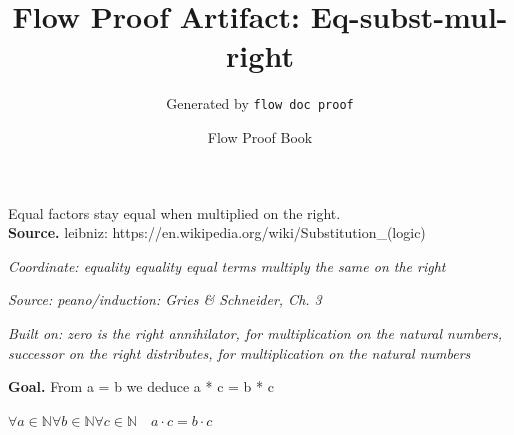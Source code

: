 \documentclass[11pt]{article}
\title{Flow Proof Artifact: Eq-subst-mul-right}
\author{Generated by \texttt{flow doc proof}}
\date{Flow Proof Book}
\theoremstyle{definition}
\begin{document}
\maketitle
Equal factors stay equal when multiplied on the right.\\[0.5em]
\textbf{Source.} leibniz: https://en.wikipedia.org/wiki/Substitution\_(logic)\\[0.5em]
\bigskip
{}\par
\smallskip\noindent\textit{Coordinate: equality \cdot equality \cdot equal terms multiply the same on the right}\par
\smallskip\noindent\textit{Source: peano/induction: Gries \& Schneider, Ch. 3}\par
\smallskip\noindent\textit{Built on: zero is the right annihilator, for multiplication on the natural numbers, successor on the right distributes, for multiplication on the natural numbers}\par
\medskip
\noindent\textbf{Goal.} From a = b we deduce a * c = b * c\par
\noindent$\displaystyle \forall a \in \mathbb{N} \forall b \in \mathbb{N} \forall c \in \mathbb{N}\quad a \cdot c = b \cdot c$\par
\medskip
\noindent
\end{document}
